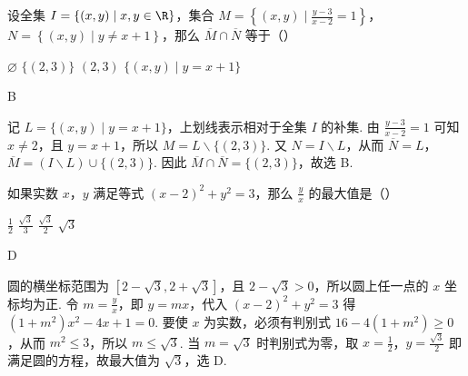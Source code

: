 \documentclass[UTF8,a4paper,oneside,11pt]{ctexbook}
\begin{document}
\begin{problem}
设全集 \(I=\left\{(x,y)\mid x,y\in\R\right\}\)，集合 \(M=\left\{(x,y)\mid \frac{y-3}{x-2}=1\right\}\)，\(N=\left\{(x,y)\mid y\neq x+1\right\}\)，那么 \(\overline{M}\cap \overline{N}\) 等于（\quad）

\choices
    {\(\varnothing\)}
    {\(\{(2,3)\}\)}
    {\((2,3)\)}
    {\(\{(x,y)\mid y=x+1\}\)}

\begin{answer}
B
\end{answer}

\begin{solution}
记 \(L=\{(x,y)\mid y=x+1\}\)，上划线表示相对于全集 \(I\) 的补集. 由 \(\frac{y-3}{x-2}=1\) 可知 \(x\neq2\)，且 \(y=x+1\)，所以 \(M=L\smallsetminus\{(2,3)\}\). 又 \(N=I\smallsetminus L\)，从而 \(\overline{N}=L\)，\(\overline{M}=(I\smallsetminus L)\cup\{(2,3)\}\). 因此 \(\overline{M}\cap\overline{N}=\{(2,3)\}\)，故选 B.
\end{solution}
\end{problem}

\begin{problem}
如果实数 \(x\)，\(y\) 满足等式 \((x-2)^2+y^2=3\)，那么 \(\frac{y}{x}\) 的最大值是（\quad）

\choices
    {\(\frac{1}{2}\)}
    {\(\frac{\sqrt{3}}{3}\)}
    {\(\frac{\sqrt{3}}{2}\)}
    {\(\sqrt{3}\)}

\begin{answer}
D
\end{answer}

\begin{solution}
圆的横坐标范围为 \([2-\sqrt{3},2+\sqrt{3}]\)，且 \(2-\sqrt{3}>0\)，所以圆上任一点的 \(x\) 坐标均为正. 令 \(m=\frac{y}{x}\)，即 \(y=mx\)，代入 \((x-2)^2+y^2=3\) 得 \((1+m^2)x^2-4x+1=0\). 要使 \(x\) 为实数，必须有判别式 \(16-4(1+m^2)\geqslant0\)，从而 \(m^2\leqslant3\)，所以 \(m\leqslant\sqrt{3}\). 当 \(m=\sqrt{3}\) 时判别式为零，取 \(x=\frac{1}{2}\)，\(y=\frac{\sqrt{3}}{2}\) 即满足圆的方程，故最大值为 \(\sqrt{3}\)，选 D.
\end{solution}
\end{problem}
\end{document}
